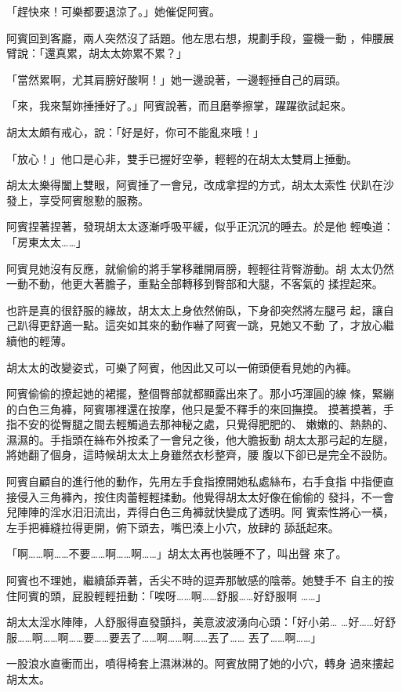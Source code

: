 「趕快來！可樂都要退涼了。」她催促阿賓。

阿賓回到客廳，兩人突然沒了話題。他左思右想，規劃手段，靈機一動
，伸腰展臂說：「還真累，胡太太妳累不累？」

「當然累啊，尤其肩膀好酸啊！」她一邊說著，一邊輕捶自己的肩頭。

「來，我來幫妳捶捶好了。」阿賓說著，而且磨拳擦掌，躍躍欲試起來。

胡太太頗有戒心，說：「好是好，你可不能亂來哦！」

「放心！」他口是心非，雙手已握好空拳，輕輕的在胡太太雙肩上捶動。

胡太太樂得闔上雙眼，阿賓捶了一會兒，改成拿捏的方式，胡太太索性
伏趴在沙發上，享受阿賓慇懃的服務。

阿賓捏著捏著，發現胡太太逐漸呼吸平緩，似乎正沉沉的睡去。於是他
輕喚道：「房東太太……」

阿賓見她沒有反應，就偷偷的將手掌移離開肩膀，輕輕往背臀游動。胡
太太仍然一動不動，他更大著膽子，重點全部轉移到臀部和大腿，不客氣的
揉捏起來。

也許是真的很舒服的緣故，胡太太上身依然俯臥，下身卻突然將左腿弓
起，讓自己趴得更舒適一點。這突如其來的動作嚇了阿賓一跳，見她又不動
了，才放心繼續他的輕薄。

胡太太的改變姿式，可樂了阿賓，他因此又可以一俯頭便看見她的內褲。

阿賓偷偷的撩起她的裙擺，整個臀部就都顯露出來了。那小巧渾圓的線
條，緊繃的白色三角褲，阿賓哪裡還在按摩，他只是愛不釋手的來回撫摸。
摸著摸著，手指不安的從臀腿之間去輕觸過去那神秘之處，只覺得肥肥的、
嫩嫩的、熱熱的、濕濕的。手指頭在絲布外按柔了一會兒之後，他大膽扳動
胡太太那弓起的左腿，將她翻了個身，這時候胡太太上身雖然衣杉整齊，腰
腹以下卻已是完全不設防。

阿賓自顧自的進行他的動作，先用左手食指撩開她私處絲布，右手食指
中指便直接侵入三角褲內，按住肉蕾輕輕揉動。他覺得胡太太好像在偷偷的
發抖，不一會兒陣陣的淫水汨汨流出，弄得白色三角褲就快變成了透明。阿
賓索性將心一橫，左手把褲縫拉得更開，俯下頭去，嘴巴湊上小穴，放肆的
舔舐起來。

「啊……啊……不要……啊……啊……」胡太太再也裝睡不了，叫出聲
來了。

阿賓也不理她，繼續舔弄著，舌尖不時的逗弄那敏感的陰蒂。她雙手不
自主的按住阿賓的頭，屁股輕輕扭動：「唉呀……啊……舒服……好舒服啊
……」

胡太太淫水陣陣，人舒服得直發顫抖，美意波波湧向心頭：「好小弟…
…好……好舒服……啊……啊……要……要丟了……啊……啊……丟了……
丟了……啊……」

一股浪水直衝而出，噴得椅套上濕淋淋的。阿賓放開了她的小穴，轉身
過來摟起胡太太。

